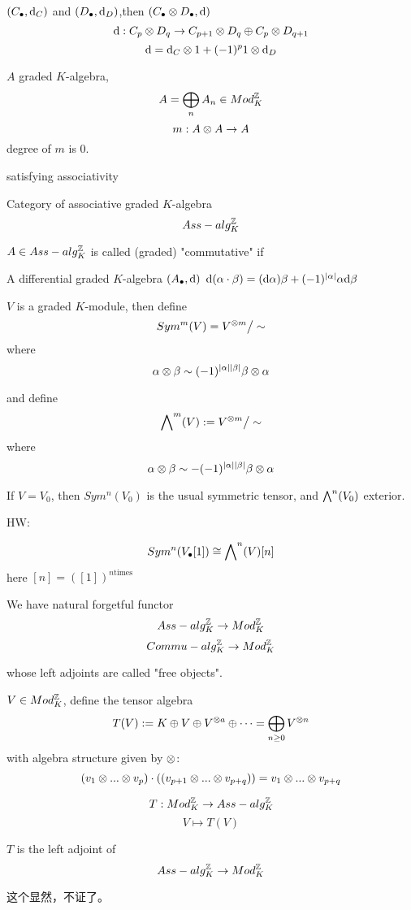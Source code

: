$(C_{\bullet},\mathrm{d}_C)$ and $(D_{\bullet},\mathrm{d}_D)$,then
$(C_{\bullet} \otimes D_{\bullet},\mathrm{d})$
$$\mathrm{d}:C_p\otimes D_q\to C_{p+1}\otimes D_q\oplus C_p\otimes D_{q+1}$$
$$\mathrm{d}=\mathrm{d}_C\otimes 1+(-1)^p1\otimes \mathrm{d}_D$$

$A$ graded $K$-algebra,
$$A=\bigoplus_nA_n\in Mod_K^{\mathbb{Z}}$$
$$m:A\otimes A\to A$$
degree of $m$ is $0$.

satisfying associativity

Category of associative graded $K$-algebra 
$$Ass-alg_K^{\mathbb{Z}}$$

$A\in Ass-alg_K^{\mathbb{Z}}$ is called (graded) "commutative" 
if


A differential graded $K$-algebra $(A_{\bullet},\mathrm{d})$
$\mathrm{d}(\alpha\cdot\beta)=(\mathrm{d}\alpha)\beta+(-1)^{|\alpha|}\alpha\mathrm{d}\beta$


$V$ is a graded $K$-module, then define
$$Sym^m(V)=V^{\otimes m}\big/\sim$$
where
$$\alpha\otimes\beta\sim(-1)^{|\alpha||\beta|}\beta\otimes\alpha$$

and define
$$\bigwedge\nolimits^{m}(V):=V^{\otimes m}\big/\sim$$
where
$$\alpha\otimes\beta\sim-(-1)^{|\alpha||\beta|}\beta\otimes\alpha$$

If $V=V_0$, then $Sym^n(V_0)$ is the usual symmetric tensor,
and $\bigwedge\nolimits^{n}(V_0)$ exterior.

HW:%

$$Sym^n(V_{\bullet}[1])\cong\bigwedge\nolimits^{n}(V)[n]$$
here $[n]=([1])^{n\text{times}}$


We have natural forgetful functor 
$$Ass-alg_K^{\mathbb{Z}}\to Mod_K^{\mathbb{Z}}$$
$$Commu-alg_K^{\mathbb{Z}}\to Mod_K^{\mathbb{Z}}$$

whose left adjoints are called "free objects".

\begin{definition}
 $V\in Mod_K^{\mathbb{Z}}$, define the tensor algebra
$$T(V):=K\oplus V\oplus V^{\otimes a}\oplus\cdots=\bigoplus_{n\geq 0}V^{\otimes n}$$
with algebra structure given by $\otimes$:
$$(v_1\otimes...\otimes v_p)\cdot((v_{p+1}\otimes...\otimes v_{p+q}))
=v_1\otimes...\otimes v_{p+q}$$
\end{definition}

$$T:Mod_K^{\mathbb{Z}}\to Ass-alg_K^{\mathbb{Z}}$$
$$V\mapsto T(V)$$

\begin{prop}
$T$ is the left adjoint of
$$Ass-alg_K^{\mathbb{Z}}\to Mod_K^{\mathbb{Z}}$$
\end{prop}
这个显然，不证了。

